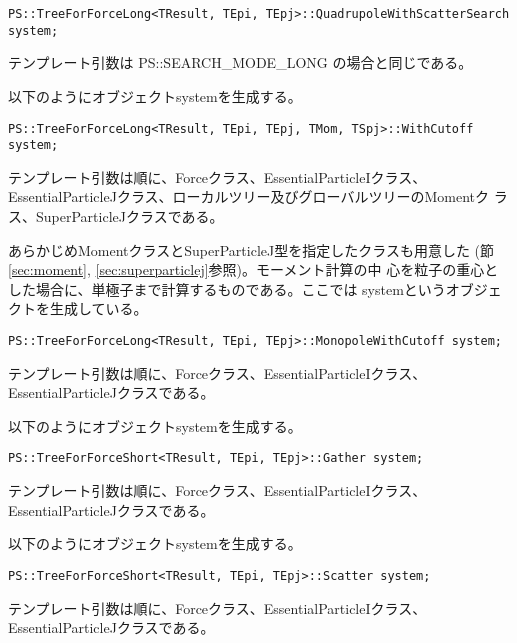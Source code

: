 \begin{screen}
\begin{verbatim}
PS::TreeForForceLong<TResult, TEpi, TEpj>::QuadrupoleWithScatterSearch system;
\end{verbatim}
\end{screen}

テンプレート引数は PS::SEARCH\_MODE\_LONG の場合と同じである。




以下のようにオブジェクトsystemを生成する。
\begin{screen}
\begin{verbatim}
PS::TreeForForceLong<TResult, TEpi, TEpj, TMom, TSpj>::WithCutoff system;
\end{verbatim}
\end{screen}
テンプレート引数は順に、Forceクラス、EssentialParticleIクラス、
EssentialParticleJクラス、ローカルツリー及びグローバルツリーのMomentク
ラス、SuperParticleJクラスである。

あらかじめMomentクラスとSuperParticleJ型を指定したクラスも用意した
(節\ref{sec:moment}, \ref{sec:superparticlej}参照)。モーメント計算の中
心を粒子の重心とした場合に、単極子まで計算するものである。ここでは
systemというオブジェクトを生成している。

\begin{screen}
\begin{verbatim}
PS::TreeForForceLong<TResult, TEpi, TEpj>::MonopoleWithCutoff system;
\end{verbatim}
\end{screen}
テンプレート引数は順に、Forceクラス、EssentialParticleIクラス、
EssentialParticleJクラスである。


以下のようにオブジェクトsystemを生成する。
\begin{screen}
\begin{verbatim}
PS::TreeForForceShort<TResult, TEpi, TEpj>::Gather system;
\end{verbatim}
\end{screen}
テンプレート引数は順に、Forceクラス、EssentialParticleIクラス、
EssentialParticleJクラスである。


以下のようにオブジェクトsystemを生成する。
\begin{screen}
\begin{verbatim}
PS::TreeForForceShort<TResult, TEpi, TEpj>::Scatter system;
\end{verbatim}
\end{screen}
テンプレート引数は順に、Forceクラス、EssentialParticleIクラス、
EssentialParticleJクラスである。

